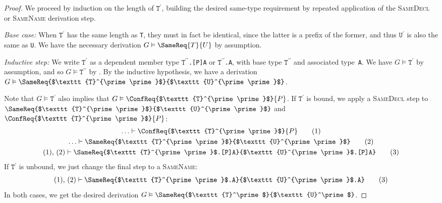 \documentclass[../generics]{subfiles}
\begin{document}
\begin{proof}
We proceed by induction on the length of $\texttt{T}^\prime$, building the desired same-type requirement by repeated application of the \textsc{SameDecl} or \textsc{SameName} derivation step.

\smallskip

\emph{Base case:} When $\texttt{T}^\prime$ has the same length as \texttt{T}, they must in fact be identical, since the latter is a prefix of the former, and thus $\texttt{U}^\prime$ is also the same as \texttt{U}. We have the necessary derivation $G\vDash\SameReq{T}{U}$ by assumption.

\emph{Inductive step:} We write $\texttt{T}^\prime$ as a dependent member type \texttt{$\texttt{T}^{\prime\prime}$.[P]A} or \texttt{$\texttt{T}^{\prime\prime}$.A}, with base type $\texttt{T}^{\prime\prime}$ and associated type~\texttt{A}. We have $G\vDash\texttt{T}^\prime$ by assumption, and so $G\vDash\texttt{T}^{\prime\prime}$ by . By the inductive hypothesis, we have a derivation $G\vDash\SameReq{$\texttt{T}^{\prime\prime}$}{$\texttt{U}^{\prime\prime}$}$.

Note that $G\vDash\texttt{T}^\prime$ also implies that $G\vDash\ConfReq{$\texttt{T}^{\prime\prime}$}{P}$. If $\texttt{T}^\prime$ is bound, we apply a \textsc{SameDecl} step to $\SameReq{$\texttt{T}^{\prime\prime}$}{$\texttt{U}^{\prime\prime}$}$ and $\ConfReq{$\texttt{T}^{\prime\prime}$}{P}$:
\begin{gather*}
\ldots\vdash\ConfReq{$\texttt{T}^{\prime\prime}$}{P}\tag{1}\\
\ldots\vdash\SameReq{$\texttt{T}^{\prime\prime}$}{$\texttt{U}^{\prime\prime}$}\tag{2}\\
(1),\,(2)\vdash\SameReq{$\texttt{T}^{\prime\prime}$.[P]A}{$\texttt{U}^{\prime\prime}$.[P]A}\tag{3}
\end{gather*}
If $\texttt{T}^\prime$ is unbound, we just change the final step to a \textsc{SameName}:
\begin{gather*}
(1),\,(2)\vdash\SameReq{$\texttt{T}^{\prime\prime}$.A}{$\texttt{U}^{\prime\prime}$.A}\tag{3}
\end{gather*}
In both cases, we get the desired derivation $G\vDash\SameReq{$\texttt{T}^\prime$}{$\texttt{U}^\prime$}$.
\end{proof}
\end{document}
